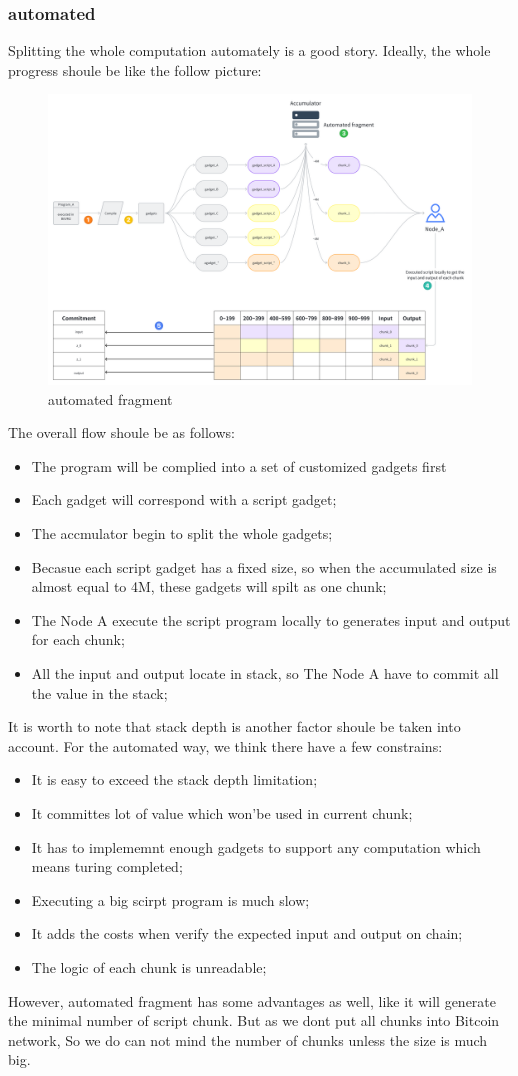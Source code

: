\subsubsection{automated}

Splitting the whole computation automately is a good story. Ideally, the whole progress shoule be like the follow picture:

\begin{figure}[ht] 
    \centering  
    \includegraphics[width=0.85\columnwidth]{images/automated-fragment.png} 
    \caption{automated fragment}
    \label{fig:automated-fragment}
\end{figure}

The overall flow shoule be as follows:
\begin{itemize}
    \item The program will be complied into a set of customized gadgets first
    \item Each gadget will correspond with a script gadget;
    \item The accmulator begin to split the whole gadgets;
    \item Becasue each script gadget has a fixed size, so when the accumulated size is almost equal to 4M, these gadgets will spilt as one chunk;
    \item The Node A execute the script program locally to generates input and output for each chunk;
    \item All the input and output locate in stack, so The Node A have to commit all the value in the stack;
\end{itemize}

It is worth to note that stack depth is another factor shoule be taken into account. For the automated way, we think there have a few constrains:
\begin{itemize}
    \item It is easy to exceed the stack depth limitation;
    \item It committes lot of value which won'be used in current chunk;
    \item It has to implememnt enough gadgets to support any computation which means turing completed;
    \item Executing a big scirpt program is much slow;
    \item It adds the costs when verify the expected input and output on chain;
    \item The logic of each chunk is unreadable;
\end{itemize}

However, automated fragment has some advantages as well, like it will generate the minimal number of script chunk. But as we dont put 
all chunks into Bitcoin network, So we do can not mind the number of chunks unless the size is much big.
